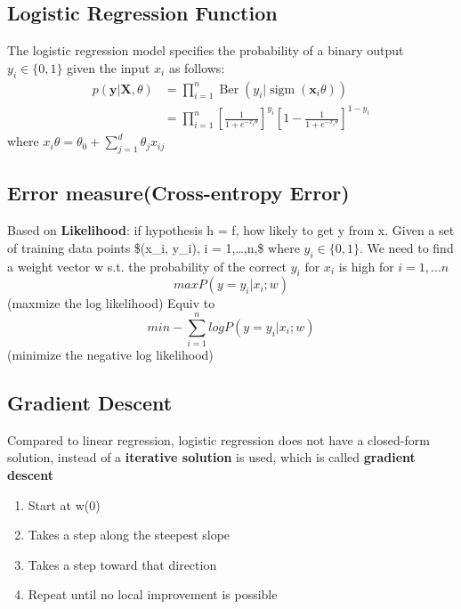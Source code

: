 \documentclass[11pt]{article}
\begin{document}
\subsection{Logistic Regression Function}
\label{sec:orgc820129}
The logistic regression model specifies the probability of a binary output \(y_i \in \{0,1\}\) given the input \(x_i\) as follows:
$$
\left.\begin{aligned} p ( \mathbf { y } | \mathbf { X } ,\theta ) & = \prod _ { i = 1} ^ { n } \operatorname{Ber} \left( y _ { i } | \operatorname{sigm} \left( \mathbf { x } _ { i } \theta \right) \right) \\ & = \prod _ { i = 1} ^ { n } \left[ \frac { 1} { 1+ e ^ { - x _ { i } \theta } } \right] ^ { y _ { i } } \left[ 1- \frac { 1} { 1+ e ^ { - x _ { i } \theta } } \right] ^ { 1- y _ { i } } \end{aligned} \right.
$$
where \(x _ { i } \theta = \theta _ { 0} + \sum _ { j = 1} ^ { d } \theta _ { j } x _ { i j }\)

\subsection{Error measure(Cross-entropy Error)}
\label{sec:org9197130}
Based on \textbf{\textbf{Likelihood}}: if hypothesis h = f, how likely to get y from x.
Given a set of training data points \$(x\_i, y\_i), i = 1,\ldots{},n,\$ where \(y_i \in \{0, 1\}\).
We need to find a weight vector w s.t. the probability of the correct \(y_i \text{ for } x_i\) is high for \(i=1,...n\)
$$
max P(y=y_i|x_i; w)
$$ (maxmize the log likelihood)
Equiv to  
$$
min -\sum_{i=1}^n log P(y=y_i|x_i; w) 
$$ (minimize the negative log likelihood)

\subsection{Gradient Descent}
\label{sec:org9ef657b}
Compared to linear regression, logistic regression does not have a closed-form solution, instead of a \textbf{\textbf{iterative solution}} is used, which is called \textbf{\textbf{gradient descent}} 
\begin{enumerate}
\item Start at w(0)
\item Takes a step along the steepest slope
\item Takes a step toward that direction
\item Repeat until no local improvement is possible
\end{enumerate}
\end{document}
